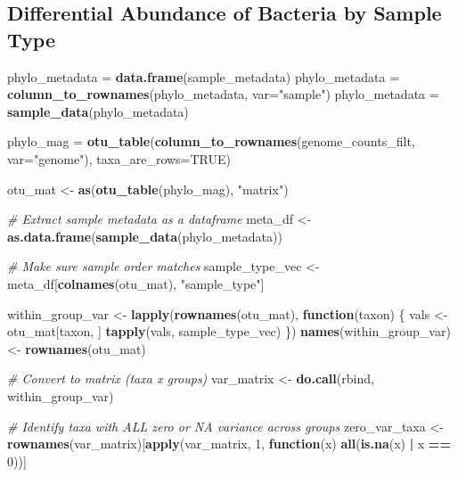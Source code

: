 \documentclass[
]{book}
\newenvironment{Shaded}{\begin{snugshade}}{\end{snugshade}}
\newcommand{\AttributeTok}[1]{\textcolor[rgb]{0.13,0.29,0.53}{#1}}
\newcommand{\CommentTok}[1]{\textcolor[rgb]{0.56,0.35,0.01}{\textit{#1}}}
\newcommand{\ConstantTok}[1]{\textcolor[rgb]{0.56,0.35,0.01}{#1}}
\newcommand{\ControlFlowTok}[1]{\textcolor[rgb]{0.13,0.29,0.53}{\textbf{#1}}}
\newcommand{\DecValTok}[1]{\textcolor[rgb]{0.00,0.00,0.81}{#1}}
\newcommand{\FunctionTok}[1]{\textcolor[rgb]{0.13,0.29,0.53}{\textbf{#1}}}
\newcommand{\NormalTok}[1]{#1}
\newcommand{\OtherTok}[1]{\textcolor[rgb]{0.56,0.35,0.01}{#1}}
\newcommand{\SpecialCharTok}[1]{\textcolor[rgb]{0.81,0.36,0.00}{\textbf{#1}}}
\newcommand{\StringTok}[1]{\textcolor[rgb]{0.31,0.60,0.02}{#1}}
\begin{document}
\subsection{Differential Abundance of Bacteria by Sample
Type}\label{differential-abundance-of-bacteria-by-sample-type}

\begin{Shaded}
\begin{Highlighting}[]
\NormalTok{phylo\_metadata }\OtherTok{=} \FunctionTok{data.frame}\NormalTok{(sample\_metadata)}
\NormalTok{phylo\_metadata }\OtherTok{=} \FunctionTok{column\_to\_rownames}\NormalTok{(phylo\_metadata, }\AttributeTok{var=}\StringTok{"sample"}\NormalTok{)}
\NormalTok{phylo\_metadata }\OtherTok{=} \FunctionTok{sample\_data}\NormalTok{(phylo\_metadata)}

\NormalTok{phylo\_mag }\OtherTok{=} \FunctionTok{otu\_table}\NormalTok{(}\FunctionTok{column\_to\_rownames}\NormalTok{(genome\_counts\_filt, }\AttributeTok{var=}\StringTok{"genome"}\NormalTok{), }\AttributeTok{taxa\_are\_rows=}\ConstantTok{TRUE}\NormalTok{)}

\NormalTok{otu\_mat }\OtherTok{\textless{}{-}} \FunctionTok{as}\NormalTok{(}\FunctionTok{otu\_table}\NormalTok{(phylo\_mag), }\StringTok{"matrix"}\NormalTok{)}

\CommentTok{\# Extract sample metadata as a dataframe}
\NormalTok{meta\_df }\OtherTok{\textless{}{-}} \FunctionTok{as.data.frame}\NormalTok{(}\FunctionTok{sample\_data}\NormalTok{(phylo\_metadata))}

\CommentTok{\# Make sure sample order matches}
\NormalTok{sample\_type\_vec }\OtherTok{\textless{}{-}}\NormalTok{ meta\_df[}\FunctionTok{colnames}\NormalTok{(otu\_mat), }\StringTok{"sample\_type"}\NormalTok{]}

\NormalTok{within\_group\_var }\OtherTok{\textless{}{-}} \FunctionTok{lapply}\NormalTok{(}\FunctionTok{rownames}\NormalTok{(otu\_mat), }\ControlFlowTok{function}\NormalTok{(taxon) \{}
\NormalTok{  vals }\OtherTok{\textless{}{-}}\NormalTok{ otu\_mat[taxon, ]}
  \FunctionTok{tapply}\NormalTok{(vals, sample\_type\_vec)}
\NormalTok{\})}
\FunctionTok{names}\NormalTok{(within\_group\_var) }\OtherTok{\textless{}{-}} \FunctionTok{rownames}\NormalTok{(otu\_mat)}

\CommentTok{\# Convert to matrix (taxa x groups)}
\NormalTok{var\_matrix }\OtherTok{\textless{}{-}} \FunctionTok{do.call}\NormalTok{(rbind, within\_group\_var)}

\CommentTok{\# Identify taxa with ALL zero or NA variance across groups}
\NormalTok{zero\_var\_taxa }\OtherTok{\textless{}{-}} \FunctionTok{rownames}\NormalTok{(var\_matrix)[}\FunctionTok{apply}\NormalTok{(var\_matrix, }\DecValTok{1}\NormalTok{, }\ControlFlowTok{function}\NormalTok{(x) }\FunctionTok{all}\NormalTok{(}\FunctionTok{is.na}\NormalTok{(x) }\SpecialCharTok{|}\NormalTok{ x }\SpecialCharTok{==} \DecValTok{0}\NormalTok{))]}


\end{Highlighting}
\end{Shaded}
\end{document}
